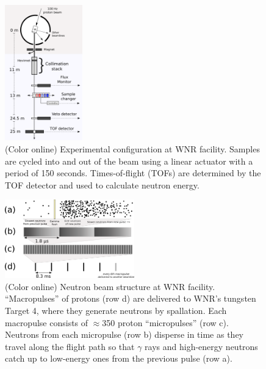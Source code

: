 \documentclass[twocolumn,secnumarabic,amssymb, nobibnotes, aps, prl,
superscriptaddress, nobalancelastpage]{revtex4}
\begin{document}
\begin{figure}
    \includegraphics[width=0.3\textwidth]{figures/ExperimentalSetup.png}
    \caption{(Color online) Experimental configuration at WNR facility.
        Samples are cycled into and out of the beam
        using a linear actuator with a period of 150 seconds. Times-of-flight (TOFs) are
    determined by the TOF detector and used to calculate neutron energy.}
    \label{ExperimentalApparatus}
\end{figure}

\begin{figure}
    \includegraphics[width=0.5\textwidth]{figures/beamStructure.png}
    \caption{(Color online) Neutron beam structure at WNR facility.
        ``Macropulses'' of protons (row d) are delivered to
        WNR's tungsten Target 4, where they generate neutrons by spallation.
        Each macropulse consists of
        $\approx$350 proton ``micropulses'' (row c). Neutrons
        from each micropulse (row b) disperse in
        time as they travel along the flight path so that $\gamma$ rays and high-energy 
    neutrons catch up to low-energy ones from the previous pulse (row a).}
    \label{BeamStructure}
\end{figure}
\end{document}
